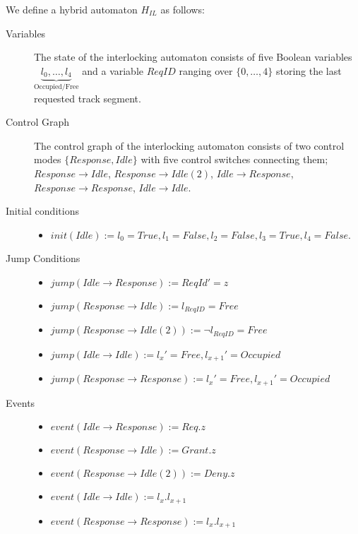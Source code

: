 \begin{mydef}
We define a hybrid automaton $H_{IL}$ as follows:
\begin{description}
\item[Variables] The state of the interlocking automaton consists of five Boolean variables  $\underbrace{l_0, \ldots , l_4}_\text{Occupied/Free}$ and a variable $ReqID$ ranging over $\{0 , \ldots , 4 \}$ storing the last requested track segment.

\item[Control Graph] The control graph of the interlocking automaton consists of two control modes $\{Response, Idle \}$ with five control switches connecting them; $Response \to Idle$, $Response \to Idle (2)$, $Idle \to Response$, $Response \to Response$, $Idle \to Idle$.

\item[Initial conditions] \hspace*{0mm}
	\begin{itemize}
	\item $init(Idle) := l_0 = True, l_1 = False, l_2 = False, l_3 = True, l_4 = False$.

	\end{itemize}

\item[Jump Conditions] \hspace*{0mm}

	\begin{itemize}
	\item $jump(Idle \to Response) :=  ReqId' = z$

	
	\item $jump(Response \to Idle) :=  l_{ReqID} = Free $ 
    

         \item $jump(Response \to Idle (2)) :=  \neg l_{ReqID} = Free$


	\item $jump(Idle \to Idle) :=  l_x' = Free, l_{x+1}' = Occupied$

	\item $jump(Response \to Response) := l_x' = Free, l_{x+1}' = Occupied$


	\end{itemize}

\item[Events] \hspace*{0mm}
\begin{itemize}
	\item $event(Idle \to Response) := Req.z$
	\item $event(Response \to Idle) := Grant.z$
	\item $event(Response \to Idle (2)) := Deny.z$
	\item $event(Idle \to Idle) := l_x.l_{x+1}$
	\item $event(Response \to Response) := l_x.l_{x+1}$	
\end{itemize}

\end{description}
\end{mydef} 
